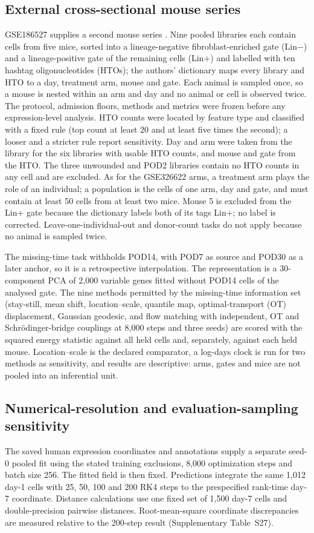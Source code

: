 \documentclass[10pt,a4paper]{article}
\begin{document}
\subsection{External cross-sectional mouse series}
GSE186527 supplies a second mouse series \citep{mascharak2022multiomic}. Nine pooled libraries each contain cells from five mice, sorted into a lineage-negative fibroblast-enriched gate (Lin$-$) and a lineage-positive gate of the remaining cells (Lin+) and labelled with ten hashtag oligonucleotides (HTOs); the authors' dictionary maps every library and HTO to a day, treatment arm, mouse and gate. Each animal is sampled once, so a mouse is nested within an arm and day and no animal or cell is observed twice. The protocol, admission floors, methods and metrics were frozen before any expression-level analysis. HTO counts were located by feature type and classified with a fixed rule (top count at least 20 and at least five times the second); a looser and a stricter rule report sensitivity. Day and arm were taken from the library for the six libraries with usable HTO counts, and mouse and gate from the HTO. The three unwounded and POD2 libraries contain no HTO counts in any cell and are excluded. As for the GSE326622 arms, a treatment arm plays the role of an individual; a population is the cells of one arm, day and gate, and must contain at least 50 cells from at least two mice. Mouse 5 is excluded from the Lin+ gate because the dictionary labels both of its tags Lin+; no label is corrected. Leave-one-individual-out and donor-count tasks do not apply because no animal is sampled twice.

The missing-time task withholds POD14, with POD7 as source and POD30 as a later anchor, so it is a retrospective interpolation. The representation is a 30-component PCA of 2,000 variable genes fitted without POD14 cells of the analysed gate. The nine methods permitted by the missing-time information set (stay-still, mean shift, location--scale, quantile map, optimal-transport (OT) displacement, Gaussian geodesic, and flow matching with independent, OT and Schr\"odinger-bridge couplings at 8,000 steps and three seeds) are scored with the squared energy statistic against all held cells and, separately, against each held mouse. Location--scale is the declared comparator, a log-days clock is run for two methods as sensitivity, and results are descriptive: arms, gates and mice are not pooled into an inferential unit.

\subsection{Numerical-resolution and evaluation-sampling sensitivity}
The saved human expression coordinates and annotations supply a separate seed-0 pooled fit using the stated training exclusions, 8,000 optimization steps and batch size 256. The fitted field is then fixed. Predictions integrate the same 1,012 day-1 cells with 25, 50, 100 and 200 RK4 steps to the prespecified rank-time day-7 coordinate. Distance calculations use one fixed set of 1,500 day-7 cells and double-precision pairwise distances. Root-mean-square coordinate discrepancies are measured relative to the 200-step result (Supplementary Table~S27).
\end{document}
